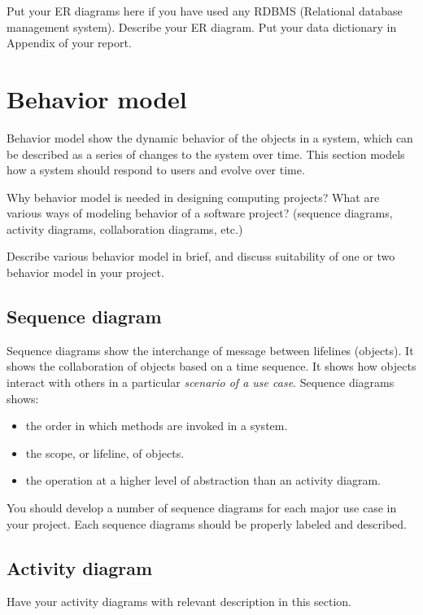 Put your ER diagrams here if you have used any RDBMS (Relational database management system). Describe your ER diagram. Put your data dictionary in Appendix of your report.

\section{Behavior model} %
\label{sec:behavior_model}

Behavior model show the dynamic behavior of the objects in a system, which can be described as a series of changes to the system over time. This section models how a system should respond to users and evolve over time.

Why behavior model is needed in designing computing projects?
What are various ways of modeling behavior of a software project? (sequence diagrams, activity diagrams, collaboration diagrams, etc.)

Describe various behavior model in brief, and discuss suitability of one or two behavior model in your project.

\subsection{Sequence diagram} %
\label{sub:sequence_diagram}
Sequence diagrams show the interchange of message between lifelines (objects). It shows the collaboration of objects based on a time sequence. It shows how objects interact with others in a particular \emph{scenario of a use case}.
Sequence diagrams shows:
\begin{itemize}
	\item the order in which methods are invoked in a system.
	\item the scope, or lifeline, of objects.
	\item the operation at a higher level of abstraction than an activity diagram.
\end{itemize}

You should develop a number of sequence diagrams for each major use case in your project. Each sequence diagrams should be properly labeled and described.

\subsection{Activity diagram} %
\label{sub:activity_diagram}
Have your activity diagrams with relevant description in this section.

